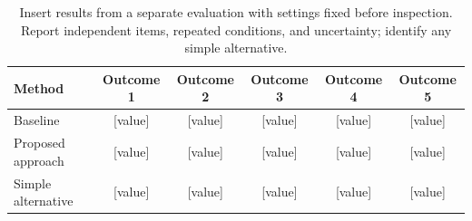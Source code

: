 \begin{table}[!ht]\centering\small
\caption{\suggest Insert results from a separate evaluation with settings fixed before inspection. Report independent items, repeated conditions, and uncertainty; identify any simple alternative.}
\label{tab:confirm}
\setlength{\tabcolsep}{6pt}
\begin{tabular}{lccccc}\toprule
Method & Outcome 1 & Outcome 2 & Outcome 3 & Outcome 4 & Outcome 5\\\midrule
Baseline & [value] & [value] & [value] & [value] & [value]\\
Proposed approach & [value] & [value] & [value] & [value] & [value]\\
Simple alternative & [value] & [value] & [value] & [value] & [value]\\
\bottomrule\end{tabular}
\end{table}
